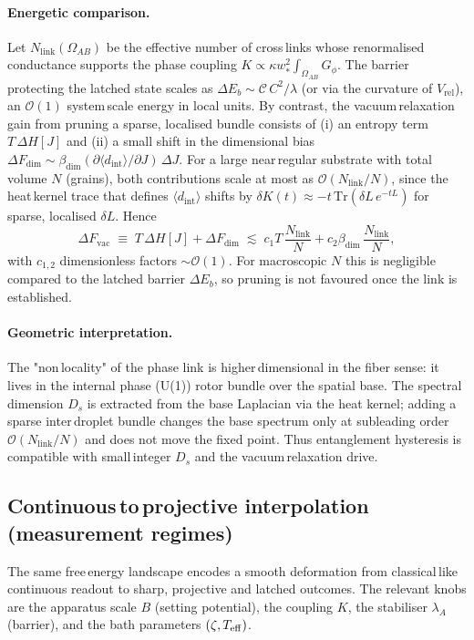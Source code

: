 \documentclass[11pt]{article}
\begin{document}
\paragraph{Energetic comparison.} Let $N_{\mathrm{link}}(\Omega_{AB})$ be the effective number of cross\,links whose renormalised conductance supports the phase coupling $K\propto\kappa w_*^2\int_{\Omega_{AB}}G_\phi$. The barrier protecting the latched state scales as $\Delta E_b\sim\mathcal C\,C^2/\lambda$ (or via the curvature of $V_{\mathrm{rel}}$), an $\mathcal O(1)$ system\,scale energy in local units. By contrast, the vacuum\,relaxation gain from pruning a sparse, localised bundle consists of (i) an entropy term $T\,\Delta H[J]$ and (ii) a small shift in the dimensional bias $\Delta F_{\mathrm{dim}}\sim\beta_{\mathrm{dim}}(\partial\langle d_{\mathrm{int}}\rangle/\partial J)\,\Delta J$. For a large near\,regular substrate with total volume $N$ (grains), both contributions scale at most as $\mathcal O(N_{\mathrm{link}}/N)$, since the heat\,kernel trace that defines $\langle d_{\mathrm{int}}\rangle$ shifts by $\delta K(t)\approx -t\,\mathrm{Tr}(\delta L\,e^{-tL})$ for sparse, localised $\delta L$. Hence
\begin{equation}
  \Delta F_{\mathrm{vac}}\;\equiv\;T\,\Delta H[J]+\Delta F_{\mathrm{dim}}\;\lesssim\;c_1 T\,\frac{N_{\mathrm{link}}}{N}+c_2\beta_{\mathrm{dim}}\,\frac{N_{\mathrm{link}}}{N},
\end{equation}
with $c_{1,2}$ dimensionless factors $\sim\mathcal O(1)$. For macroscopic $N$ this is negligible compared to the latched barrier $\Delta E_b$, so pruning is not favoured once the link is established.

\paragraph{Geometric interpretation.} The "non\,locality" of the phase link is higher\,dimensional in the fiber sense: it lives in the internal phase (U(1)) rotor bundle over the spatial base. The spectral dimension $D_s$ is extracted from the base Laplacian via the heat kernel; adding a sparse inter\,droplet bundle changes the base spectrum only at subleading order $\mathcal O(N_{\mathrm{link}}/N)$ and does not move the fixed point. Thus entanglement hysteresis is compatible with small\,integer $D_s$ and the vacuum\,relaxation drive.

\subsection{Continuous\,to\,projective interpolation (measurement regimes)}
The same free\,energy landscape encodes a smooth deformation from classical\,like continuous readout to sharp, projective and latched outcomes. The relevant knobs are the apparatus scale $B$ (setting potential), the coupling $K$, the stabiliser $\lambda_A$ (barrier), and the bath parameters $(\zeta, T_{\rm eff})$.
\end{document}

